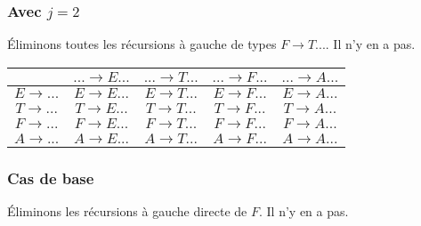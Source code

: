 \documentclass[class=article]{standalone}
\begin{document}
\subsubsection*{Avec $j=2$}
Éliminons toutes les récursions à gauche de types $F \rightarrow T...$. Il n'y en a pas.
\begin{center}
    \begin{tabular}{c|c|c|c|c|}
        \cellcolor[HTML]{FFFFFF}                     & 
        \cellcolor[HTML]{FFFFFF} $... \rightarrow E...$ &
        \cellcolor[HTML]{FFFFFF} $... \rightarrow T...$ & 
        \cellcolor[HTML]{FFFFFF} $... \rightarrow F...$ & 
        \cellcolor[HTML]{FFFFFF} $... \rightarrow A...$ \\
    \hline
        \cellcolor[HTML]{FFFFFF} $E \rightarrow ...$ & 
        \cellcolor[HTML]{FF0000} $E \rightarrow E...$ & 
        \cellcolor[HTML]{ABFF00} $E \rightarrow T...$ & 
        \cellcolor[HTML]{ABFF00} $E \rightarrow F...$ & 
        \cellcolor[HTML]{ABFF00} $E \rightarrow A...$ \\
    \hline
        \cellcolor[HTML]{FFFFFF} $T \rightarrow ...$ & 
        \cellcolor[HTML]{FF0000} $T \rightarrow E...$ & 
        \cellcolor[HTML]{FF0000} $T \rightarrow T...$ & 
        \cellcolor[HTML]{ABFF00} $T \rightarrow F...$ &
        \cellcolor[HTML]{ABFF00} $T \rightarrow A...$ \\
    \hline
        \cellcolor[HTML]{FFFFFF} $F \rightarrow ...$ &
        \cellcolor[HTML]{FF0000} $F \rightarrow E...$ &
        \cellcolor[HTML]{FF0000} $F \rightarrow T...$ & 
        \cellcolor[HTML]{FFFFFF} $F \rightarrow F...$ & 
        \cellcolor[HTML]{ABFF00} $F \rightarrow A...$ \\
    \hline
        \cellcolor[HTML]{FFFFFF} $A \rightarrow ...$ & 
        \cellcolor[HTML]{FFFFFF} $A \rightarrow E...$ & 
        \cellcolor[HTML]{FFFFFF} $A \rightarrow T...$ & 
        \cellcolor[HTML]{FFFFFF} $A \rightarrow F...$ & 
        \cellcolor[HTML]{FFFFFF} $A \rightarrow A...$ \\
    \hline
    \end{tabular}
\end{center}

\subsubsection*{Cas de base}
Éliminons les récursions à gauche directe de $F$. Il n'y en a pas.
\end{document}

